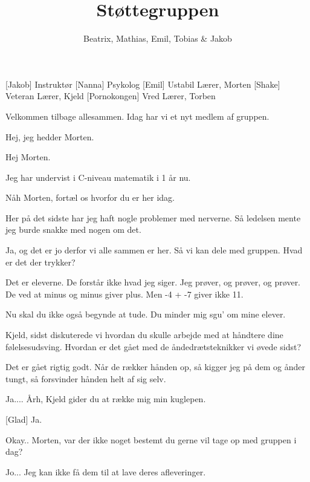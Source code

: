\documentclass[a4paper,11pt]{article}
\title{Støttegruppen}
\author{Beatrix, Mathias, Emil, Tobias \& Jakob}
\begin{document}
\maketitle

\begin{roles}
[Jakob] Instruktør
[Nanna] Psykolog 
[Emil] Ustabil Lærer, Morten
[Shake] Veteran Lærer, Kjeld
[Pornokongen] Vred Lærer, Torben
\end{roles}

\begin{sketch}
 Velkommen tilbage allesammen. Idag har vi et nyt medlem af gruppen.

 Hej, jeg hedder Morten.

 Hej Morten.

 Jeg har undervist i C-niveau matematik i 1 år nu.

 Nåh Morten, fortæl os hvorfor du er her idag.

 Her på det sidste har jeg haft nogle problemer med nerverne. Så ledelsen mente jeg burde snakke med nogen om det.

 Ja, og det er jo derfor vi alle sammen er her. Så vi kan dele med gruppen. Hvad er det der trykker?

 Det er eleverne. De forstår ikke hvad jeg siger. Jeg prøver, og prøver, og prøver. De ved at minus og minus giver plus. Men -4 + -7 giver ikke 11. 

 Nu skal du ikke også begynde at tude. Du minder mig sgu' om mine elever.

 Kjeld, sidst diskuterede vi hvordan du skulle arbejde med at håndtere dine følelsesudsving. Hvordan er det gået med de åndedrætsteknikker vi øvede sidst?

 Det er gået rigtig godt. Når de rækker hånden op, så kigger jeg på dem og ånder tungt, så forsvinder hånden helt af sig selv. 

 Ja....  Årh, Kjeld gider du at række mig min kuglepen.

[Glad] Ja. 

 Okay.. Morten, var der ikke noget bestemt du gerne vil tage op med gruppen i dag?

 Jo... Jeg kan ikke få dem til at lave deres afleveringer. 


\end{sketch}
\end{document}
